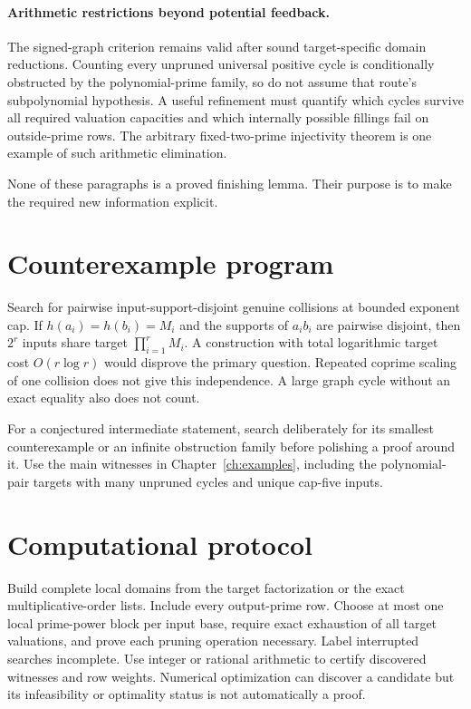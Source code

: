\paragraph{Arithmetic restrictions beyond potential feedback.}
The signed-graph criterion remains valid after sound target-specific domain
reductions. Counting every unpruned universal positive cycle is conditionally
obstructed by the polynomial-prime family, so do not assume that route's
subpolynomial hypothesis. A useful refinement must quantify which cycles survive
all required valuation capacities and which internally possible fillings fail
on outside-prime rows. The arbitrary fixed-two-prime injectivity theorem is one
example of such arithmetic elimination.

None of these paragraphs is a proved finishing lemma. Their purpose is to make
the required new information explicit.

\section{Counterexample program}
Search for pairwise input-support-disjoint genuine collisions at bounded exponent
cap. If $h(a_i)=h(b_i)=M_i$ and the supports of $a_ib_i$ are pairwise disjoint,
then $2^r$ inputs share target $\prod_{i=1}^rM_i$. A construction with total
logarithmic target cost $O(r\log r)$ would disprove the primary question.
Repeated coprime scaling of one collision does not give this independence.
A large graph cycle without an exact equality also does not count.

For a conjectured intermediate statement, search deliberately for its smallest
counterexample or an infinite obstruction family before polishing a proof around
it. Use the main witnesses in Chapter~\ref{ch:examples}, including the
polynomial-pair targets with many unpruned cycles and unique cap-five inputs.

\section{Computational protocol}
Build complete local domains from the target factorization or the exact
multiplicative-order lists. Include every output-prime row. Choose at most one
local prime-power block per input base, require exact exhaustion of all target
valuations, and prove each pruning operation necessary. Label interrupted
searches incomplete. Use integer or rational arithmetic to certify discovered
witnesses and row weights. Numerical optimization can discover a candidate but
its infeasibility or optimality status is not automatically a proof.

